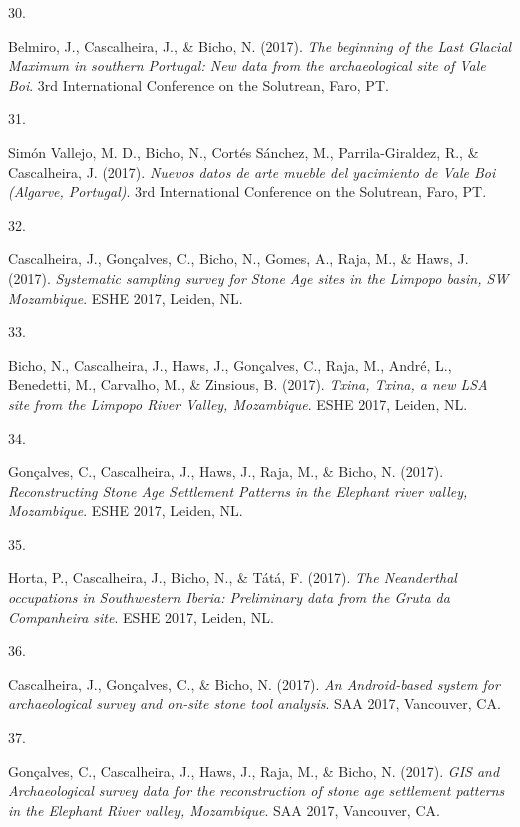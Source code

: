 \documentclass[11pt,a4paper,]{awesome-cv}
\newlength{\cslhangindent}
\newlength{\csllabelwidth}
\newenvironment{CSLReferences}[2] %
 {\begin{list}{}{%
  \setlength{\itemindent}{0pt}
  \setlength{\leftmargin}{0pt}
  \setlength{\parsep}{0pt}
  \ifodd #1
   \setlength{\leftmargin}{\cslhangindent}
   \setlength{\itemindent}{-1\cslhangindent}
  \fi
  \setlength{\itemsep}{#2\baselineskip}}}
 {\end{list}}
\newcommand{\CSLLeftMargin}[1]{\parbox[t]{\csllabelwidth}{\strut#1\strut}}
\newcommand{\CSLRightInline}[1]{\parbox[t]{\linewidth - \csllabelwidth}{\strut#1\strut}}
\begin{document}
\begin{CSLReferences}{0}{0}
\CSLLeftMargin{30. }%
\CSLRightInline{Belmiro, J., Cascalheira, J., \& Bicho, N. (2017).
\emph{The beginning of the Last Glacial Maximum in southern Portugal:
New data from the archaeological site of Vale Boi}. 3rd International
Conference on the Solutrean, Faro, PT.}

\CSLLeftMargin{31. }%
\CSLRightInline{Simón Vallejo, M. D., Bicho, N., Cortés Sánchez, M.,
Parrila-Giraldez, R., \& Cascalheira, J. (2017). \emph{Nuevos datos de
arte mueble del yacimiento de Vale Boi (Algarve, Portugal)}. 3rd
International Conference on the Solutrean, Faro, PT.}

\CSLLeftMargin{32. }%
\CSLRightInline{Cascalheira, J., Gonçalves, C., Bicho, N., Gomes, A.,
Raja, M., \& Haws, J. (2017). \emph{Systematic sampling survey for Stone
Age sites in the Limpopo basin, SW Mozambique}. ESHE 2017, Leiden, NL.}

\CSLLeftMargin{33. }%
\CSLRightInline{Bicho, N., Cascalheira, J., Haws, J., Gonçalves, C.,
Raja, M., André, L., Benedetti, M., Carvalho, M., \& Zinsious, B.
(2017). \emph{Txina, Txina, a new LSA site from the Limpopo River
Valley, Mozambique}. ESHE 2017, Leiden, NL.}

\CSLLeftMargin{34. }%
\CSLRightInline{Gonçalves, C., Cascalheira, J., Haws, J., Raja, M., \&
Bicho, N. (2017). \emph{Reconstructing Stone Age Settlement Patterns in
the Elephant river valley, Mozambique}. ESHE 2017, Leiden, NL.}

\CSLLeftMargin{35. }%
\CSLRightInline{Horta, P., Cascalheira, J., Bicho, N., \& Tátá, F.
(2017). \emph{The Neanderthal occupations in Southwestern Iberia:
Preliminary data from the Gruta da Companheira site}. ESHE 2017, Leiden,
NL.}

\CSLLeftMargin{36. }%
\CSLRightInline{Cascalheira, J., Gonçalves, C., \& Bicho, N. (2017).
\emph{An Android-based system for archaeological survey and on-site
stone tool analysis}. SAA 2017, Vancouver, CA.}

\CSLLeftMargin{37. }%
\CSLRightInline{Gonçalves, C., Cascalheira, J., Haws, J., Raja, M., \&
Bicho, N. (2017). \emph{GIS and Archaeological survey data for the
reconstruction of stone age settlement patterns in the Elephant River
valley, Mozambique}. SAA 2017, Vancouver, CA.}


\end{CSLReferences}
\end{document}
